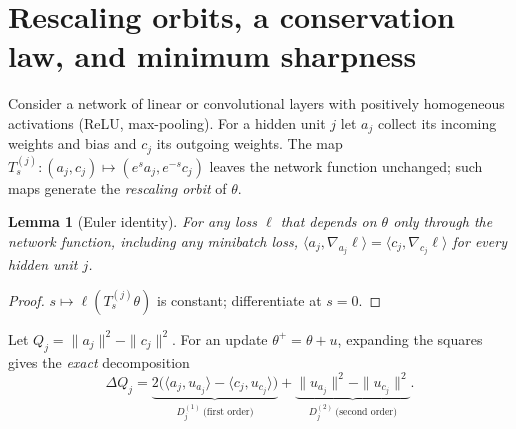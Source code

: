 \documentclass[10pt,twocolumn]{article}
\newtheorem{lemma}{Lemma}
\theoremstyle{remark}
\begin{document}
\section{Rescaling orbits, a conservation law, and minimum sharpness}\label{sec:setup}
Consider a network of linear or convolutional layers with positively homogeneous activations (ReLU, max-pooling). For a hidden unit $j$ let $a_j$ collect its incoming weights and bias and $c_j$ its outgoing weights. The map $T^{(j)}_s:(a_j,c_j)\mapsto(e^{s}a_j,e^{-s}c_j)$ leaves the network function unchanged; such maps generate the \emph{rescaling orbit} of $\theta$.

\begin{lemma}[Euler identity]\label{lem:euler}
For any loss $\ell$ that depends on $\theta$ only through the network function, including any minibatch loss, $\langle a_j,\nabla_{a_j}\ell\rangle=\langle c_j,\nabla_{c_j}\ell\rangle$ for every hidden unit $j$.
\end{lemma}
\begin{proof}
$s\mapsto\ell(T^{(j)}_s\theta)$ is constant; differentiate at $s=0$.
\end{proof}

Let $Q_j=\|a_j\|^2-\|c_j\|^2$. For an update $\theta^+=\theta+u$, expanding the squares gives the \emph{exact} decomposition
\begin{equation}\label{eq:decomp}
\Delta Q_j=\underbrace{2\big(\langle a_j,u_{a_j}\rangle-\langle c_j,u_{c_j}\rangle\big)}_{D^{(1)}_j\ \text{(first order)}}+\underbrace{\|u_{a_j}\|^2-\|u_{c_j}\|^2}_{D^{(2)}_j\ \text{(second order)}}.
\end{equation}
\end{document}
